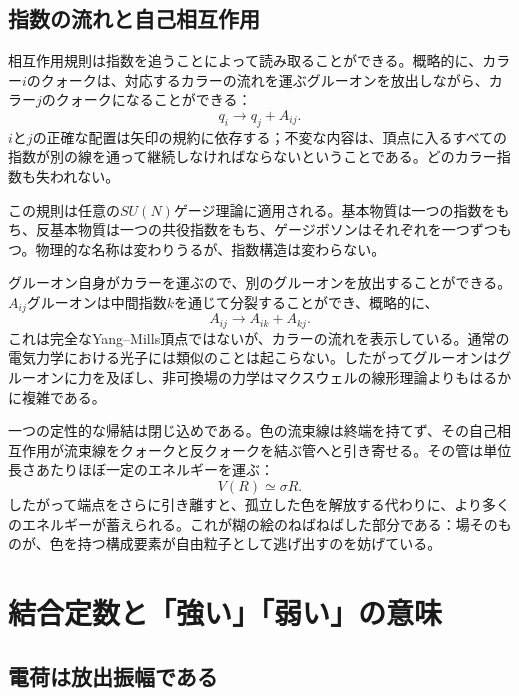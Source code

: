 \subsection{指数の流れと自己相互作用}

相互作用規則は指数を追うことによって読み取ることができる。概略的に、カラー\(i\)のクォークは、対応するカラーの流れを運ぶグルーオンを放出しながら、カラー\(j\)のクォークになることができる：
\begin{equation}
q_i\longrightarrow q_j+A_{ij}.
\label{eq:l5-quark-gluon-vertex}
\end{equation}
\(i\)と\(j\)の正確な配置は矢印の規約に依存する；不変な内容は、頂点に入るすべての指数が別の線を通って継続しなければならないということである。どのカラー指数も失われない。

この規則は任意の\(SU(N)\)ゲージ理論に適用される。基本物質は一つの指数をもち、反基本物質は一つの共役指数をもち、ゲージボソンはそれぞれを一つずつもつ。物理的な名称は変わりうるが、指数構造は変わらない。

グルーオン自身がカラーを運ぶので、別のグルーオンを放出することができる。\(A_{ij}\)グルーオンは中間指数\(k\)を通じて分裂することができ、概略的に、
\begin{equation}
A_{ij}\longrightarrow A_{ik}+A_{kj}.
\label{eq:l5-three-gluon-index}
\end{equation}
これは完全なYang--Mills頂点ではないが、カラーの流れを表示している。通常の電気力学における光子には類似のことは起こらない。したがってグルーオンはグルーオンに力を及ぼし、非可換場の力学はマクスウェルの線形理論よりもはるかに複雑である。

一つの定性的な帰結は閉じ込めである。色の流束線は終端を持てず、その自己相互作用が流束線をクォークと反クォークを結ぶ管へと引き寄せる。その管は単位長さあたりほぼ一定のエネルギーを運ぶ：
\begin{equation}
V(R)\simeq \sigma R.
\end{equation}
したがって端点をさらに引き離すと、孤立した色を解放する代わりに、より多くのエネルギーが蓄えられる。これが糊の絵のねばねばした部分である：場そのものが、色を持つ構成要素が自由粒子として逃げ出すのを妨げている。

\section{結合定数と「強い」「弱い」の意味}

\subsection{電荷は放出振幅である}

